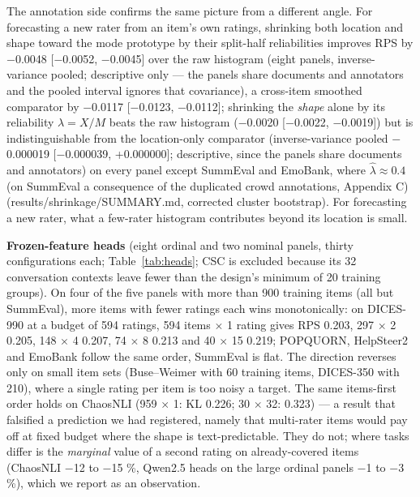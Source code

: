 \documentclass[10pt,twocolumn]{article}
\begin{document}
The annotation side confirms the same picture from a different angle. For forecasting a new rater from an item's own ratings, shrinking both location and shape toward the mode prototype by their split-half reliabilities improves RPS by $-$0.0048 {[}$-$0.0052, $-$0.0045{]} over the raw histogram (eight panels, inverse-variance pooled; descriptive only --- the panels share documents and annotators and the pooled interval ignores that covariance), a cross-item smoothed comparator by $-$0.0117 {[}$-$0.0123, $-$0.0112{]}; shrinking the \emph{shape} alone by its reliability \(\lambda=X/M\) beats the raw histogram ($-$0.0020 {[}$-$0.0022, $-$0.0019{]}) but is indistinguishable from the location-only comparator (inverse-variance pooled $-$0.000019 {[}$-$0.000039, +0.000000{]}; descriptive, since the panels share documents and annotators) on every panel except SummEval and EmoBank, where \(\hat\lambda\approx0.4\) (on SummEval a consequence of the duplicated crowd annotations, Appendix C) (results/shrinkage/SUMMARY.md, corrected cluster bootstrap). For forecasting a new rater, what a few-rater histogram contributes beyond its location is small.

\textbf{Frozen-feature heads} (eight ordinal and two nominal panels, thirty configurations each; Table~\ref{tab:heads}; CSC is excluded because its 32 conversation contexts leave fewer than the design's minimum of 20 training groups). On four of the five panels with more than 900 training items (all but SummEval), more items with fewer ratings each wins monotonically: on DICES-990 at a budget of 594 ratings, 594 items $\times$ 1 rating gives RPS 0.203, 297 $\times$ 2 0.205, 148 $\times$ 4 0.207, 74 $\times$ 8 0.213 and 40 $\times$ 15 0.219; POPQUORN, HelpSteer2 and EmoBank follow the same order, SummEval is flat. The direction reverses only on small item sets (Buse--Weimer with 60 training items, DICES-350 with 210), where a single rating per item is too noisy a target. The same items-first order holds on ChaosNLI (959 $\times$ 1: KL 0.226; 30 $\times$ 32: 0.323) --- a result that falsified a prediction we had registered, namely that multi-rater items would pay off at fixed budget where the shape is text-predictable. They do not; where tasks differ is the \emph{marginal} value of a second rating on already-covered items (ChaosNLI $-$12 to $-$15 \%, Qwen2.5 heads on the large ordinal panels $-$1 to $-$3 \%), which we report as an observation.
\end{document}
